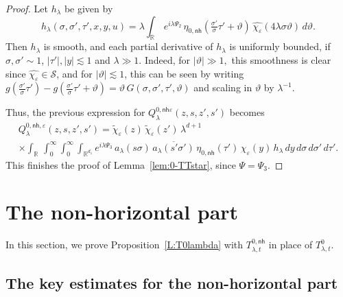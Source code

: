 \documentclass[leqno]{amsart}
\theoremstyle{definition}
\theoremstyle{remark}
\numberwithin{equation}{section}
\newcommand{\R}{\mathbb{R}}
\newcommand\la{{\lambda}}
\newcommand\cS{{\mathcal {S}}}
\newcommand\ve{{\varepsilon}}
\begin{document}
\begin{proof}
Let $h_\lambda$ be given by
\[
h_\lambda(\sigma,\sigma',\tau',x,y,u) = \lambda \int_{\R} \, e^{i\lambda\Psi_2} \, \eta_{0,\mathsf{nh}}(\tfrac{\sigma'}\sigma \tau' + \vartheta) \, \widehat{\chi_\ve}(4\lambda\sigma \vartheta) \, d\vartheta.
\]
Then $h_\lambda$ is smooth, and  each partial derivative of $h_\lambda$ is uniformly bounded, if $\sigma,\sigma' \sim 1$, $ |\tau'|,|y| \lesssim 1$ and $\lambda\gg 1$.  Indeed, for $|\vartheta|\gg 1,$ this smoothness is clear since $\widehat{\chi_\ve}\in \cS$, and for $|\vartheta|\lesssim 1$, this can be seen by writing $g(\tfrac{\sigma'}\sigma \tau')-g(\tfrac{\sigma'}\sigma \tau' + \vartheta)=\vartheta \,G(\sigma,\sigma',\tau',\vartheta)$ and scaling in $\vartheta$ by $\la^{-1}.$ 

Thus, the previous expression for  $Q^{0,\mathsf{nh}\varepsilon}_\lambda(z,s,z',s')$ becomes
\begin{multline*}
 Q^{0,\mathsf{nh},\varepsilon}_\lambda(z,s,z',s') =
\tilde \chi_{\varepsilon}(z) \, \tilde\chi_{\varepsilon}(z') \,\lambda^{d+1} \\
\times \int_\R \, \int_0^\infty \! \int_0^\infty \! \int_{\R^{d_1}}e^{i\lambda\Psi_3} \, a_\lambda(s\sigma)  \,\overline{a_\lambda(s'\sigma')} \,\eta_{0,\mathsf{nh}}(\tau')  \, 
\chi_{\varepsilon}(y) \, h_\lambda \, dy \, d\sigma \, d\sigma' \, d\tau'.
\end{multline*}
This finishes the proof of Lemma~\ref{lem:0-TTstar}, since $\Psi=\Psi_3.$
\end{proof}


\section{The non-horizontal part} \label{sec:k=0-nonhor}

In this section, we prove Proposition~\ref{L:T0lambda} with $T^{0,\mathsf{nh}}_{\lambda,t}$ in place of $T^0_{\lambda,t}$.

\subsection{The key estimates for the non-horizontal part}
\end{document}
